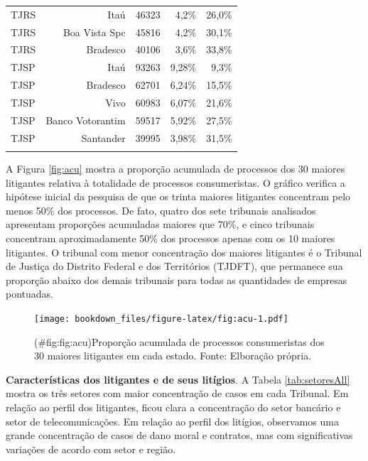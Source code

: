 \documentclass[]{report}
\begin{document}
\begin{longtable}{lrrrr}
  TJRS & Itaú & 46323 & 4,2\% & 26,0\% \\
  TJRS & Boa Vista Spc & 45816 & 4,2\% & 30,1\% \\
  TJRS & Bradesco & 40106 & 3,6\% & 33,8\% \\
  TJSP & Itaú & 93263 & 9,28\% & 9,3\% \\
  TJSP & Bradesco & 62701 & 6,24\% & 15,5\% \\
  TJSP & Vivo & 60983 & 6,07\% & 21,6\% \\
  TJSP & Banco
Votorantim & 59517 & 5,92\% & 27,5\% \\
  TJSP & Santander & 39995 & 3,98\% & 31,5\% \\
   \hline
\hline
\label{tab:resultAll}
\end{longtable}

A Figura \ref{fig:acu} mostra a proporção acumulada de processos dos 30
maiores litigantes relativa à totalidade de processos consumeristas. O
gráfico verifica a hipótese inicial da pesquisa de que os trinta maiores
litigantes concentram pelo menos 50\% dos processos. De fato, quatro dos
sete tribunais analisados apresentam proporções acumuladas maiores que
70\%, e cinco tribunais concentram aproximadamente 50\% dos processos
apenas com os 10 maiores litigantes. O tribunal com menor concentração
dos maiores litigantes é o Tribunal de Justiça do Distrito Federal e dos
Territórios (TJDFT), que permanece sua proporção abaixo dos demais
tribunais para todas as quantidades de empresas pontuadas.

\begin{figure}[htbp]
\centering
\texttt{[image: bookdown\_files/figure-latex/fig:acu-1.pdf]}
\caption{(\#fig:fig:acu)Proporção acumulada de processos consumeristas
dos 30 maiores litigantes em cada estado. Fonte: Elboração própria.}
\end{figure}

\textbf{Características dos litigantes e de seus litígios}. A Tabela
\ref{tab:setoresAll} mostra os três setores com maior concentração de
casos em cada Tribunal. Em relação ao perfil dos litigantes, ficou clara
a concentração do setor bancário e setor de telecomunicações. Em relação
ao perfil dos litígios, observamos uma grande concentração de casos de
dano moral e contratos, mas com significativas variações de acordo com
setor e região.
\end{document}
